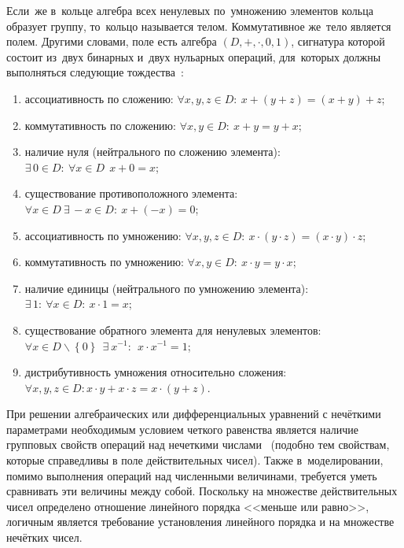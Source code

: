 Если~же в~кольце алгебра всех ненулевых по~умножению элементов кольца образует группу, то~кольцо называется телом. Коммутативное же~тело является полем. Другими словами, поле есть алгебра $\left( D,+,\cdot ,0,1 \right)$, сигнатура которой состоит из~двух бинарных и~двух нульарных операций, для~которых должны выполняться следующие тождества~\cite{Adelson_Velskiy, Bauman_DM, Yakhyaeva}:
\begin{enumerate}
	\item ассоциативность по сложению: $\forall x,y,z\in D:\ x+\left( y+z \right)=\left( x+y \right)+z$;
	\item коммутативность по сложению: $\forall x,y\in D:\ x+y=y+x$;
	\item наличие нуля (нейтрального по сложению элемента): $\exists \,0\in D:\ \forall x\in D\ \ x+0=x$;
	\item существование противоположного элемента:$\forall x\in D\ \exists \,-x\in D:\ x+\left( -x \right)=0$;
	\item ассоциативность по умножению: $\forall x,y,z\in D:\ x\cdot \left( y\cdot z \right)=\left( x\cdot y \right)\cdot z$;
	\item коммутативность по умножению: $\forall x,y\in D:\ x\cdot y=y\cdot x$;
	\item наличие единицы (нейтрального по умножению элемента): $\exists \,1:\ \forall x\in D:\ x\cdot 1=x$;
	\item существование обратного элемента для ненулевых элементов: $\forall x\in D\backslash \left\{ 0 \right\}\ \ \exists \ {{x}^{-1}}:\ \ x\cdot {{x}^{-1}}=1$;
	\item дистрибутивность умножения относительно сложения: $\forall x,y,z\in D:x\cdot y+x\cdot z=x\cdot \left( y+z \right)$.
\end{enumerate}

При решении алгебраических или дифференциальных уравнений с нечёткими параметрами необходимым условием четкого равенства является наличие групповых свойств операций над нечеткими числами~\cite{Serbia_Algebras} (подобно тем свойствам, которые справедливы в поле действительных чисел). Также в~моделировании, помимо выполнения операций над численными величинами, требуется уметь сравнивать эти величины между собой. Поскольку на множестве действительных чисел определено отношение линейного порядка <<меньше или равно>>, логичным является требование установления линейного порядка и на множестве нечётких чисел.

